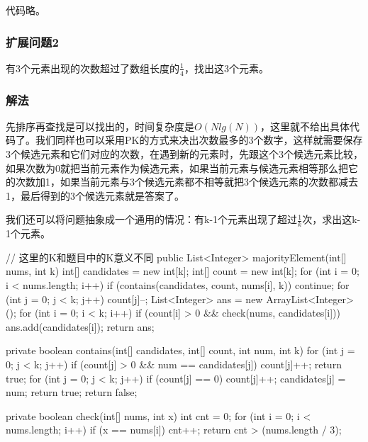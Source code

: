 代码略。
\subsubsection{扩展问题2}
有3个元素出现的次数超过了数组长度的$\frac{1}{4}$，找出这3个元素。

\subsubsection{解法}
先排序再查找是可以找出的，时间复杂度是$O(Nlg(N))$，这里就不给出具体代码了。我们同样也可以采用PK的方式来决出次数最多的3个数字，这样就需要保存3个候选元素和它们对应的次数，在遇到新的元素时，先跟这个3个候选元素比较，
如果次数为0就把当前元素作为候选元素，如果当前元素与候选元素相等那么把它的次数加1，如果当前元素与3个候选元素都不相等就把3个候选元素的次数都减去1，最后得到的3个候选元素就是答案了。

我们还可以将问题抽象成一个通用的情况：有k-1个元素出现了超过$\frac{1}{k}$次，求出这k-1个元素。

\begin{Codex}[label={[$O(N)+O(K)$]Chap02_03_WaterKing.java}]
	// 这里的K和题目中的K意义不同
	public List<Integer> majorityElement(int[] nums, int k) {
		int[] candidates = new int[k];
		int[] count = new int[k];
		for (int i = 0; i < nums.length; i++) {
			if (contains(candidates, count, nums[i], k)) {
				continue;
			}
			for (int j = 0; j < k; j++) {
				count[j]--;
			}
		}
		List<Integer> ans = new ArrayList<Integer>();
		for (int i = 0; i < k; i++) {
			if (count[i] > 0 && check(nums, candidates[i])) {
				ans.add(candidates[i]);
			}
		}
		return ans;
	}
	
	private boolean contains(int[] candidates, int[] count, int num, int k) {
		for (int j = 0; j < k; j++) {
			if (count[j] > 0 && num == candidates[j]) {
				count[j]++;
				return true;
			}
		}
		for (int j = 0; j < k; j++) {
			if (count[j] == 0) {
				count[j]++;
				candidates[j] = num;
				return true;
			}
		}
		return false;
	}
	
	private boolean check(int[] nums, int x) {
		int cnt = 0;
		for (int i = 0; i < nums.length; i++) {
			if (x == nums[i]) cnt++;
		}
		return cnt > (nums.length / 3);
	}
\end{Codex}


